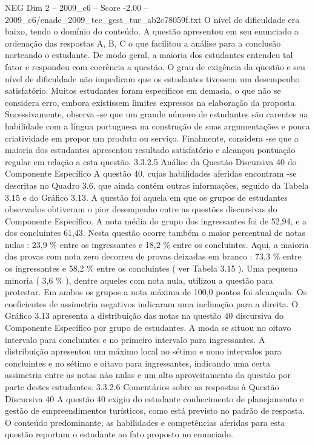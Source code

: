 \begin{textsample}{NEG Dim 2 – 2009\_c6 – Score -2.00 – 2009\_c6/enade\_2009\_tec\_gest\_tur\_ab2c78059f.txt}
O nível de dificuldade era baixo, tendo o domínio do conteúdo.
A questão apresentou em seu enunciado a ordenação das respostas A, B, C o que facilitou a análise para a conclusão norteando o estudante.
De modo geral, a maioria dos estudantes entendeu tal fator e respondeu com coerência a questão.
O grau de exigência da questão e seu nível de dificuldade não impediram que os estudantes tivessem um desempenho satisfatório.
Muitos estudantes foram específicos em demasia, o que não se considera erro, embora existissem limites expressos na elaboração da proposta.
Sucessivamente, observa -se que um grande número de estudantes são carentes na habilidade com a língua portuguesa na construção de suas argumentações e pouca criatividade em propor um produto ou serviço.
Finalmente, considera -se que a maioria dos estudantes apresentou resultado satisfatório e alcançou pontuação regular em relação a esta questão. 3.3.2.5 Análise da Questão Discursiva 40 do Componente Específico A questão 40, cujas habilidades aferidas encontram -se descritas no Quadro 3.6, que ainda contém outras informações, seguido da Tabela 3.15 e do Gráfico 3.13.
A questão foi aquela em que os grupos de estudantes observados obtiveram o pior desempenho entre as questões discursivas do Componente Específico.
A nota média do grupo dos ingressantes foi de 52,94, e a dos concluintes 61,43.
Nesta questão ocorre também o maior percentual de notas nulas : 23,9 \% entre os ingressantes e 18,2 \% entre os concluintes.
Aqui, a maioria das provas com nota zero decorreu de provas deixadas em branco : 73,3 \% entre os ingressantes e 58,2 \% entre os concluintes ( ver Tabela 3.15 ).
Uma pequena minoria ( 3,6 \% ), dentre aqueles com nota nula, utilizou a questão para protestar.
Em ambos os grupos a nota máxima de 100,0 pontos foi alcançada.
Os coeficientes de assimetria negativos indicaram uma inclinação para a direita.
O Gráfico 3.13 apresenta a distribuição das notas na questão 40 discursiva do Componente Específico por grupo de estudantes.
A moda se situou no oitavo intervalo para concluintes e no primeiro intervalo para ingressantes.
A distribuição apresentou um máximo local no sétimo e nono intervalos para concluintes e no sétimo e oitavo para ingressantes, indicando uma certa assimetria entre as notas não nulas e um alto aproveitamento da questão por parte destes estudantes. 3.3.2.6 Comentários sobre as respostas à Questão Discursiva 40 A questão 40 exigiu do estudante conhecimento de planejamento e gestão de empreendimentos turísticos, como está previsto no padrão de resposta.
O conteúdo predominante, as habilidades e competências aferidas para esta questão reportam o estudante ao fato proposto no enunciado.

\end{textsample}
